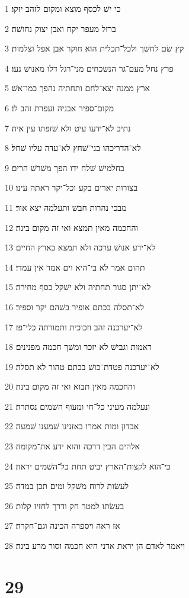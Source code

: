 \par 1 כי ישׁ לכסף מוצא ומקום לזהב יזקו׃
\par 2 ברזל מעפר יקח ואבן יצוק נחושׁה׃
\par 3 קץ שׂם לחשׁך ולכל־תכלית הוא חוקר אבן אפל וצלמות׃
\par 4 פרץ נחל מעם־גר הנשׁכחים מני־רגל דלו מאנושׁ נעו׃
\par 5 ארץ ממנה יצא־לחם ותחתיה נהפך כמו־אשׁ׃
\par 6 מקום־ספיר אבניה ועפרת זהב לו׃
\par 7 נתיב לא־ידעו עיט ולא שׁזפתו עין איה׃
\par 8 לא־הדריכהו בני־שׁחץ לא־עדה עליו שׁחל׃
\par 9 בחלמישׁ שׁלח ידו הפך משׁרשׁ הרים׃
\par 10 בצורות יארים בקע וכל־יקר ראתה עינו׃
\par 11 מבכי נהרות חבשׁ ותעלמה יצא אור׃
\par 12 והחכמה מאין תמצא ואי זה מקום בינה׃
\par 13 לא־ידע אנושׁ ערכה ולא תמצא בארץ החיים׃
\par 14 תהום אמר לא בי־היא וים אמר אין עמדי׃
\par 15 לא־יתן סגור תחתיה ולא ישׁקל כסף מחירה׃
\par 16 לא־תסלה בכתם אופיר בשׁהם יקר וספיר׃
\par 17 לא־יערכנה זהב וזכוכית ותמורתה כלי־פז׃
\par 18 ראמות וגבישׁ לא יזכר ומשׁך חכמה מפנינים׃
\par 19 לא־יערכנה פטדת־כושׁ בכתם טהור לא תסלה׃
\par 20 והחכמה מאין תבוא ואי זה מקום בינה׃
\par 21 ונעלמה מעיני כל־חי ומעוף השׁמים נסתרה׃
\par 22 אבדון ומות אמרו באזנינו שׁמענו שׁמעה׃
\par 23 אלהים הבין דרכה והוא ידע את־מקומה׃
\par 24 כי־הוא לקצות־הארץ יביט תחת כל־השׁמים יראה׃
\par 25 לעשׂות לרוח משׁקל ומים תכן במדה׃
\par 26 בעשׂתו למטר חק ודרך לחזיז קלות׃
\par 27 אז ראה ויספרה הכינה וגם־חקרה׃
\par 28 ויאמר לאדם הן יראת אדני היא חכמה וסור מרע בינה׃

\chapter{29}

